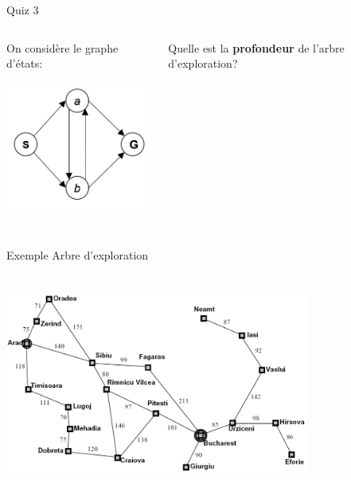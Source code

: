 \documentclass{beamer}
\begin{document}
\begin{frame}[t]{Quiz 3}
 \begin{columns}
   \begin{column}{0.5\textwidth}
     \centering
      On considère le graphe d'états:\\
     \includegraphics[width=5cm,height=5cm]{./images/four_state_graph.png}
   \end{column}
   \begin{column}{0.5\textwidth}
     Quelle est la \textbf{profondeur} de l'arbre d'exploration?\\[1cm]
\centering
{}
     
   \end{column}
 \end{columns} 
\end{frame}

\begin{frame}[t]{Exemple Arbre d'exploration}
 \centering
 \includegraphics[width=10cm,height=8cm]{./images/worlmap_model.png}
\end{frame}
\end{document}

